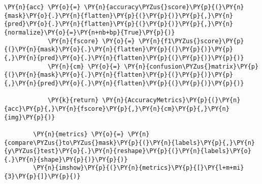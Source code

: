 \begin{Verbatim}[commandchars=\\\{\}]
            \PY{n}{acc} \PY{o}{=} \PY{n}{accuracy\PYZus{}score}\PY{p}{(}\PY{n}{mask}\PY{o}{.}\PY{n}{flatten}\PY{p}{(}\PY{p}{)}\PY{p}{,}\PY{n}{pred}\PY{o}{.}\PY{n}{flatten}\PY{p}{(}\PY{p}{)}\PY{p}{,}\PY{n}{normalize}\PY{o}{=}\PY{n+nb+bp}{True}\PY{p}{)}
            \PY{n}{fscore} \PY{o}{=} \PY{n}{f1\PYZus{}score}\PY{p}{(}\PY{n}{mask}\PY{o}{.}\PY{n}{flatten}\PY{p}{(}\PY{p}{)}\PY{p}{,}\PY{n}{pred}\PY{o}{.}\PY{n}{flatten}\PY{p}{(}\PY{p}{)}\PY{p}{)}
            \PY{n}{cm} \PY{o}{=} \PY{n}{confusion\PYZus{}matrix}\PY{p}{(}\PY{n}{mask}\PY{o}{.}\PY{n}{flatten}\PY{p}{(}\PY{p}{)}\PY{p}{,}\PY{n}{pred}\PY{o}{.}\PY{n}{flatten}\PY{p}{(}\PY{p}{)}\PY{p}{)}
            
            \PY{k}{return} \PY{n}{AccuracyMetrics}\PY{p}{(}\PY{n}{acc}\PY{p}{,}\PY{n}{fscore}\PY{p}{,}\PY{n}{cm}\PY{p}{,}\PY{n}{img}\PY{p}{)}
        
        \PY{n}{metrics} \PY{o}{=} \PY{n}{compare\PYZus{}to\PYZus{}mask}\PY{p}{(}\PY{n}{labels}\PY{p}{,}\PY{n}{y\PYZus{}test}\PY{o}{.}\PY{n}{reshape}\PY{p}{(}\PY{n}{labels}\PY{o}{.}\PY{n}{shape}\PY{p}{)}\PY{p}{)}
        \PY{n}{imshow}\PY{p}{(}\PY{n}{metrics}\PY{p}{[}\PY{l+m+mi}{3}\PY{p}{]}\PY{p}{)}
\end{Verbatim}

    \begin{center}
    \end{center}
    { \hspace*{\fill} \\}
    

    
    
